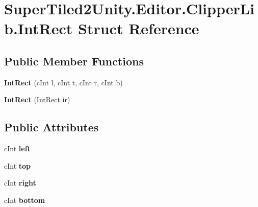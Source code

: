 \hypertarget{struct_super_tiled2_unity_1_1_editor_1_1_clipper_lib_1_1_int_rect}{}\section{Super\+Tiled2\+Unity.\+Editor.\+Clipper\+Lib.\+Int\+Rect Struct Reference}
\label{struct_super_tiled2_unity_1_1_editor_1_1_clipper_lib_1_1_int_rect}
\subsection*{Public Member Functions}
\begin{DoxyCompactItemize}
\item 
\mbox{\label{struct_super_tiled2_unity_1_1_editor_1_1_clipper_lib_1_1_int_rect_ae0a6af8d41944453b8531dfb4f892687}} 
{\bfseries Int\+Rect} (c\+Int l, c\+Int t, c\+Int r, c\+Int b)
\item 
\mbox{\label{struct_super_tiled2_unity_1_1_editor_1_1_clipper_lib_1_1_int_rect_ac521d0f0383c040eef550678caf265b5}} 
{\bfseries Int\+Rect} (\mbox{\hyperlink{struct_super_tiled2_unity_1_1_editor_1_1_clipper_lib_1_1_int_rect}{Int\+Rect}} ir)
\end{DoxyCompactItemize}
\subsection*{Public Attributes}
\begin{DoxyCompactItemize}
\item 
\mbox{\label{struct_super_tiled2_unity_1_1_editor_1_1_clipper_lib_1_1_int_rect_a081c4e6a152af33f76b679c6aede7e82}} 
c\+Int {\bfseries left}
\item 
\mbox{\label{struct_super_tiled2_unity_1_1_editor_1_1_clipper_lib_1_1_int_rect_ada83ea88b34d4da8ce3c92dca2111408}} 
c\+Int {\bfseries top}
\item 
\mbox{\label{struct_super_tiled2_unity_1_1_editor_1_1_clipper_lib_1_1_int_rect_a0d925dc3a22fdaf42d2cff8dd7a0a9f1}} 
c\+Int {\bfseries right}
\item 
\mbox{\label{struct_super_tiled2_unity_1_1_editor_1_1_clipper_lib_1_1_int_rect_a723ebcd64ffb9ce8a8808ff05d916499}} 
c\+Int {\bfseries bottom}
\end{DoxyCompactItemize}



